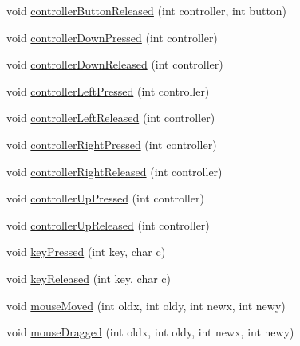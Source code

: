 \begin{DoxyCompactItemize}
\item 
void \mbox{\hyperlink{classorg_1_1newdawn_1_1slick_1_1state_1_1_state_based_game_a83c8be949774abfd63a5837422c6f8fc}{controller\+Button\+Released}} (int controller, int button)
\item 
void \mbox{\hyperlink{classorg_1_1newdawn_1_1slick_1_1state_1_1_state_based_game_a3132de3950587a94bc059b40b5a7a703}{controller\+Down\+Pressed}} (int controller)
\item 
void \mbox{\hyperlink{classorg_1_1newdawn_1_1slick_1_1state_1_1_state_based_game_a510241b92e4f3670e04d240ecc5b797a}{controller\+Down\+Released}} (int controller)
\item 
void \mbox{\hyperlink{classorg_1_1newdawn_1_1slick_1_1state_1_1_state_based_game_a9bba4427977b841b78d8706910f0a8e7}{controller\+Left\+Pressed}} (int controller)
\item 
void \mbox{\hyperlink{classorg_1_1newdawn_1_1slick_1_1state_1_1_state_based_game_ae3b66d6b132b6622fa13c125f806e30b}{controller\+Left\+Released}} (int controller)
\item 
void \mbox{\hyperlink{classorg_1_1newdawn_1_1slick_1_1state_1_1_state_based_game_a6285a648c82d4f944f1789059c9e27c3}{controller\+Right\+Pressed}} (int controller)
\item 
void \mbox{\hyperlink{classorg_1_1newdawn_1_1slick_1_1state_1_1_state_based_game_a6bcf1a21902e2d05a6c8f7d14f575264}{controller\+Right\+Released}} (int controller)
\item 
void \mbox{\hyperlink{classorg_1_1newdawn_1_1slick_1_1state_1_1_state_based_game_aca15c428e95858fe7d3061948f581e22}{controller\+Up\+Pressed}} (int controller)
\item 
void \mbox{\hyperlink{classorg_1_1newdawn_1_1slick_1_1state_1_1_state_based_game_a7b4ef38f15fdd419c18b7bddf6958a04}{controller\+Up\+Released}} (int controller)
\item 
void \mbox{\hyperlink{classorg_1_1newdawn_1_1slick_1_1state_1_1_state_based_game_aa75b77403a10674ff58a415d8e0c2309}{key\+Pressed}} (int key, char c)
\item 
void \mbox{\hyperlink{classorg_1_1newdawn_1_1slick_1_1state_1_1_state_based_game_a5b246f61c1717c4e14ca066191f0350a}{key\+Released}} (int key, char c)
\item 
void \mbox{\hyperlink{classorg_1_1newdawn_1_1slick_1_1state_1_1_state_based_game_a61aab9c2a3c18c20bf1ed2c50276c818}{mouse\+Moved}} (int oldx, int oldy, int newx, int newy)
\item 
void \mbox{\hyperlink{classorg_1_1newdawn_1_1slick_1_1state_1_1_state_based_game_a7c9b5a16d368beda39b0024cc5d1fe29}{mouse\+Dragged}} (int oldx, int oldy, int newx, int newy)

\end{DoxyCompactItemize}
